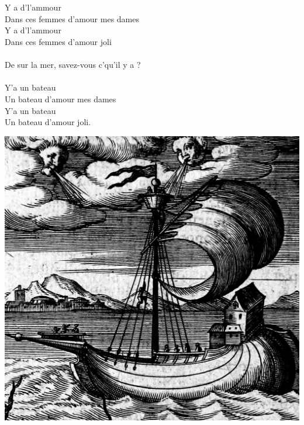 \\\\Y a d'l'ammour
\\Dans ces femmes d'amour mes dames
\\Y a d'l'ammour
\\Dans ces femmes d'amour joli
\\\\De sur la mer, savez-vous c'qu'il y a ? \bissimple
\\\\Y'a un bateau
\\Un bateau d'amour mes dames
\\Y'a un bateau
\\Un bateau d'amour joli.

\bigskip
\bigskip
\bigskip
\begin{center}
\includegraphics[width=1\textwidth]{images/brev27.png}
\end{center}

\breakpage